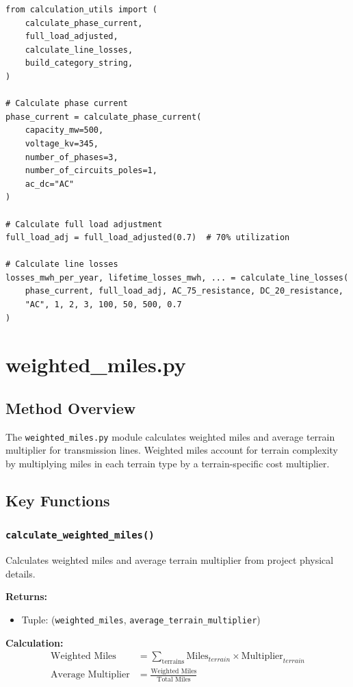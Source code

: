 \documentclass[ctcc_full_documentation.tex]{subfiles}
\begin{document}
\begin{lstlisting}
from calculation_utils import (
    calculate_phase_current,
    full_load_adjusted,
    calculate_line_losses,
    build_category_string,
)

# Calculate phase current
phase_current = calculate_phase_current(
    capacity_mw=500,
    voltage_kv=345,
    number_of_phases=3,
    number_of_circuits_poles=1,
    ac_dc="AC"
)

# Calculate full load adjustment
full_load_adj = full_load_adjusted(0.7)  # 70% utilization

# Calculate line losses
losses_mwh_per_year, lifetime_losses_mwh, ... = calculate_line_losses(
    phase_current, full_load_adj, AC_75_resistance, DC_20_resistance,
    "AC", 1, 2, 3, 100, 50, 500, 0.7
)
\end{lstlisting}

\section{weighted\_miles.py}

\subsection{Method Overview}

The \texttt{weighted\_miles.py} module calculates weighted miles and average terrain multiplier for transmission lines. Weighted miles account for terrain complexity by multiplying miles in each terrain type by a terrain-specific cost multiplier.

\subsection{Key Functions}

\subsubsection{\texttt{calculate\_weighted\_miles()}}

Calculates weighted miles and average terrain multiplier from project physical details.

\textbf{Returns:}
\begin{itemize}
    \item Tuple: (\texttt{weighted\_miles}, \texttt{average\_terrain\_multiplier})
\end{itemize}

\textbf{Calculation:}
\begin{align}
\text{Weighted Miles} &= \sum_{\text{terrains}} \text{Miles}_{terrain} \times \text{Multiplier}_{terrain} \\
\text{Average Multiplier} &= \frac{\text{Weighted Miles}}{\text{Total Miles}}
\end{align}
\end{document}
